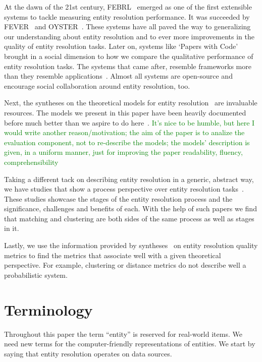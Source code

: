 \documentclass[journal]{IEEEtran}
\begin{document}
    At the dawn of the 21st century, FEBRL~\cite{febrl2002} emerged as one of the
    first extensible systems to tackle measuring entity resolution performance.
    It was succeeded by FEVER~\cite{fever2009} and OYSTER~\cite{oyster2012}.
    These systems have all paved the way to generalizing our understanding about
    entity resolution and to ever more improvements in the quality of entity
    resolution tasks.
    Later on, systems like `Papers with Code'~\cite{papwithcode2019} brought in
    a social dimension to how we compare the qualitative performance of entity
    resolution tasks.
    The systems that came after, resemble frameworks more than they resemble
    applications~\cite{magellan2020,jedai2017}.
    Almost all systems are open-source and encourage social collaboration around
    entity resolution, too.
    
    Next, the syntheses on the theoretical models for entity
    resolution~\cite{fs1969,Ben2009Swoosh,Tal11} are invaluable resources.
    The models we present in this paper have been heavily documented before much
    better than we aspire to do here~\cite{Tal11,tal2013}.
    \textcolor{green}{It's nice to be humble, but here I would write another reason/motivation; the aim of the paper is to analize the evaluation component, not to re-describe the models; the models' description is given, in a uniform manner, just for improving the paper readability, fluency, comprehensibility}
    
    Taking a different tack on describing entity resolution in a generic,
    abstract way, we have studies that show a process perspective over entity
    resolution tasks~\cite{Pap19,Chen09}.
    These studies showcase the stages of the entity resolution process and the
    significance, challenges and benefits of each.
    With the help of such papers we find that matching and clustering are both
    sides of the same process as well as stages in it.

    Lastly, we use the information provided by syntheses~\cite{hitesh2012} on
    entity resolution quality metrics to find the metrics that associate well
    with a given theoretical perspective.
    For example, clustering or distance metrics do not describe well a
    probabilistic system.

    \section{Terminology}\label{sec:terminology}

    Throughout this paper the term ``entity'' is reserved for real-world items.
    We need new terms for the computer-friendly representations of entities.
    We start by saying that entity resolution operates on data sources.
\end{document}

